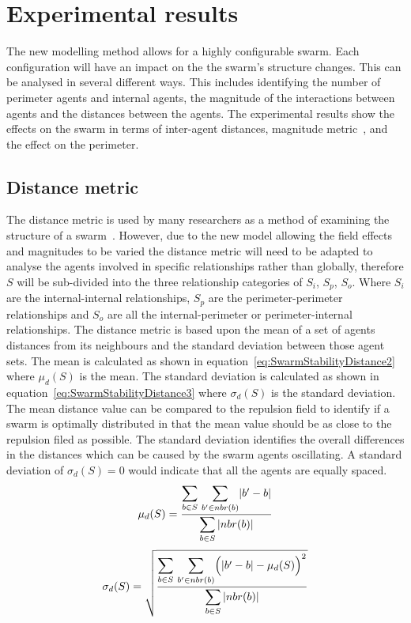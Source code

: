 \documentclass[12pt,a4paper]{IEEEtran}
\newcommand{\card}[1]{\vert{#1}\vert}
\newcommand{\vbb}[2]{#2-#1}
\begin{document}
\section{Experimental results\label{sec:ExperimentalResults}}
The new modelling method allows for a highly configurable swarm. Each configuration will have an impact on the the swarm's structure changes. This can be analysed in several different ways. This includes identifying the number of perimeter agents and internal agents, the magnitude of the interactions between agents and the distances between the agents. The experimental results show the effects on the swarm in terms of  inter-agent distances, magnitude metric~\cite{eliot2018metric}, and the effect on the perimeter.

\subsection{Distance metric}
The distance metric is used by many researchers as a method of examining the structure of a swarm~\cite{BAFVM:06,BAF:06,elamvazhuthi2015optimal,VG:05,SW:03}. However, due to the new model allowing the field effects and magnitudes to be varied the distance metric will need to be adapted to analyse the agents involved in specific relationships rather than globally, therefore $S$ will be sub-divided into the three relationship categories of $S_i$, $S_p$, $S_{o}$. Where $S_i$ are the internal-internal relationships, $S_p$ are the perimeter-perimeter relationships and $S_{o}$ are all the internal-perimeter or perimeter-internal relationships. 
The distance metric is based upon the mean of a set of agents distances from its neighbours and the standard deviation between those agent sets. The mean is calculated as shown in equation~\ref{eq:SwarmStabilityDistance2} where $\mu_d(S)$ is the mean. The standard deviation is calculated as shown in equation~\ref{eq:SwarmStabilityDistance3} where $\sigma_d(S)$ is the standard deviation. The mean distance value can be compared to the repulsion field to identify if a swarm is optimally distributed in that the mean value should be as close to the repulsion filed as possible. The standard deviation identifies the overall differences in the distances which can be caused by the swarm agents oscillating. A standard deviation of $\sigma_d(S) = 0$ would indicate that all the agents are equally spaced.
\small
\begin{equation}
\label{eq:SwarmStabilityDistance2}
\mu_d(S) = \frac{\mathlarger{\sum_{b \in S}}~\mathlarger{\sum_{b' \in nbr(b)}}\card{\vbb{b}{b'}}}{\mathlarger{\sum_{b \in S}\card{nbr(b)}}}
\end{equation}
\normalsize
\small
\begin{equation}
\label{eq:SwarmStabilityDistance3}
\sigma_d(S) = \sqrt{\frac{\mathlarger{\sum_{b \in S}}~\mathlarger{\sum_{b' \in nbr(b)}}\Big(\card{\vbb{b}{b'}} - \mu_d(S)\Big)^2}{\mathlarger{\sum_{b \in S}\card{nbr(b)}}}}
\end{equation}
\normalsize
\end{document}

